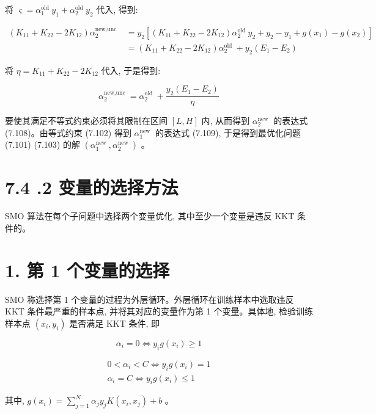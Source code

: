 \documentclass[10pt]{article}
\begin{document}
将 $\varsigma=\alpha_{1}^{\text {old }} y_{1}+\alpha_{2}^{\text {old }} y_{2}$ 代入, 得到:

$$
\begin{aligned}
\left(K_{11}+K_{22}-2 K_{12}\right) \alpha_{2}^{\text {new,unc }} & =y_{2}\left[\left(K_{11}+K_{22}-2 K_{12}\right) \alpha_{2}^{\text {old }} y_{2}+y_{2}-y_{1}+g\left(x_{1}\right)-g\left(x_{2}\right)\right] \\
& =\left(K_{11}+K_{22}-2 K_{12}\right) \alpha_{2}^{\text {old }}+y_{2}\left(E_{1}-E_{2}\right)
\end{aligned}
$$

将 $\eta=K_{11}+K_{22}-2 K_{12}$ 代入, 于是得到:

$$
\alpha_{2}^{\text {new,unc }}=\alpha_{2}^{\text {old }}+\frac{y_{2}\left(E_{1}-E_{2}\right)}{\eta}
$$

要使其满足不等式约束必须将其限制在区间 $[L, H]$ 内, 从而得到 $\alpha_{2}^{\text {new }}$ 的表达式 (7.108)。由等式约束 (7.102) 得到 $\alpha_{1}^{\text {new }}$ 的表达式 (7.109), 于是得到最优化问题 (7.101) (7.103) 的解 $\left(\alpha_{1}^{\text {new }}, \alpha_{2}^{\text {new }}\right)$ 。

\section*{7.4 .2 变量的选择方法}
SMO 算法在每个子问题中选择两个变量优化, 其中至少一个变量是违反 KKT 条件的。

\section*{1. 第 1 个变量的选择}
SMO 称选择第 1 个变量的过程为外层循环。外层循环在训练样本中选取违反 KKT 条件最严重的样本点, 并将其对应的变量作为第 1 个变量。具体地, 检验训练样本点 $\left(x_{i}, y_{i}\right)$ 是否满足 KKT 条件, 即


\begin{equation*}
\alpha_{i}=0 \Leftrightarrow y_{i} g\left(x_{i}\right) \geqslant 1 \tag{7.111}
\end{equation*}


\[
\begin{array}{r}
0<\alpha_{i}<C \Leftrightarrow y_{i} g\left(x_{i}\right)=1 \\
\alpha_{i}=C \Leftrightarrow y_{i} g\left(x_{i}\right) \leqslant 1 \tag{7.113}
\end{array}
\]

其中, $g\left(x_{i}\right)=\sum_{j=1}^{N} \alpha_{j} y_{j} K\left(x_{i}, x_{j}\right)+b$ 。
\end{document}

